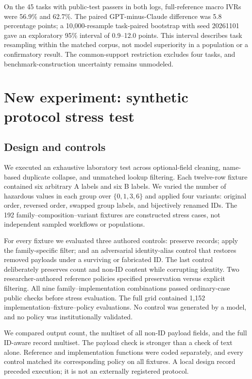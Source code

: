 \documentclass[manuscript,screen,review,anonymous]{acmart}
\begin{document}
On the 45 tasks with public-test passers in both logs, full-reference macro IVRs were 56.9\% and 62.7\%. The paired GPT-minus-Claude difference was 5.8 percentage points; a 10,000-resample task-paired bootstrap with seed 20261101 gave an exploratory 95\% interval of 0.9--12.0 points. This interval describes task resampling within the matched corpus, not model superiority in a population or a confirmatory result. The common-support restriction excludes four tasks, and benchmark-construction uncertainty remains unmodeled.

\section{New experiment: synthetic protocol stress test}
\subsection{Design and controls}
We executed an exhaustive laboratory test across optional-field cleaning, name-based duplicate collapse, and unmatched lookup filtering. Each twelve-row fixture contained six arbitrary A labels and six B labels. We varied the number of hazardous values in each group over $\{0,1,3,6\}$ and applied four variants: original order, reversed order, swapped group labels, and bijectively renamed IDs. The 192 family--composition--variant fixtures are constructed stress cases, not independent sampled workflows or populations.

For every fixture we evaluated three authored controls: preserve records; apply the family-specific filter; and an adversarial identity-alias control that restores removed payloads under a surviving or fabricated ID. The last control deliberately preserves count and non-ID content while corrupting identity. Two researcher-authored reference policies specified preservation versus explicit filtering. All nine family--implementation combinations passed ordinary-case public checks before stress evaluation. The full grid contained 1,152 implementation--fixture--policy evaluations. No control was generated by a model, and no policy was institutionally validated.

We compared output count, the multiset of all non-ID payload fields, and the full ID-aware record multiset. The payload check is stronger than a check of text alone. Reference and implementation functions were coded separately, and every control matched its corresponding policy on all fixtures. A local design record preceded execution; it is not an externally registered protocol.
\end{document}
